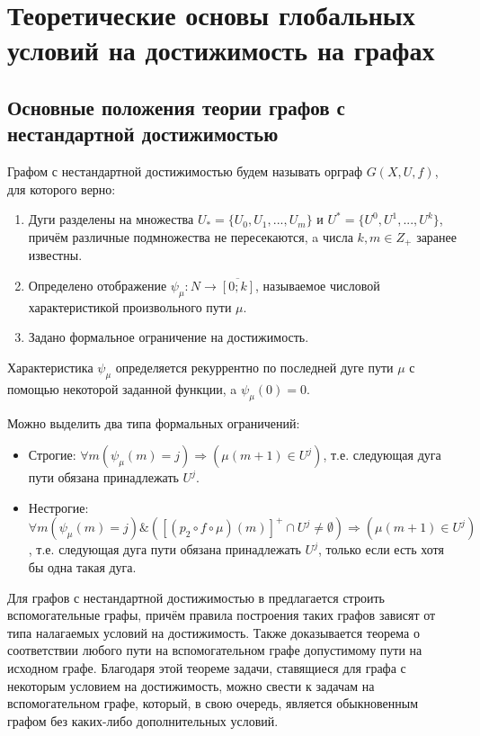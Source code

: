 \chapter{Теоретические основы глобальных условий на достижимость на графах}

\section{Основные положения теории графов с нестандартной достижимостью}

\begin{definition}
	Графом с нестандартной достижимостью будем называть орграф $G(X,U,f)$, для которого верно:
	\begin{enumerate}
		\item Дуги разделены на множества $U_* = \{U_0, U_1, ... , U_m\}$ и $U^* = \{U^0, U^1, ... , U^k\}$, причём различные подмножества не пересекаются, a числа $k, m \in Z_+$ заранее известны.
		\item Определено отображение $\psi_\mu:N\to \overline{ [0; k] }$, называемое числовой характеристикой произвольного пути $\mu$.
		\item Задано формальное ограничение на достижимость.
	\end{enumerate}
\end{definition}

Характеристика $\psi_\mu$ определяется рекуррентно по последней дуге пути $\mu$ с помощью некоторой заданной функции, a $\psi_\mu(0) = 0$.

Можно выделить два типа формальных ограничений:
\begin{itemize}
	\item Строгие: $\forall m (\psi_\mu(m) = j) \Longrightarrow (\mu(m+1) \in U^j) $, т.е. следующая дуга пути обязана принадлежать $U^j$.
	\item Нестрогие: $\forall m (\psi_\mu(m) = j) \& ([(p_2 \circ f \circ \mu)(m)]^+ \cap U^j \neq \emptyset) \Longrightarrow (\mu(m+1) \in U^j) $, т.е. следующая дуга пути обязана принадлежать $U^j$, только если есть хотя бы одна такая дуга.
\end{itemize}

Для графов с нестандартной достижимостью в \cite{Mono} предлагается строить вспомогательные графы, причём правила построения таких графов зависят от типа налагаемых условий на достижимость. Также доказывается теорема о соответствии любого пути на вспомогательном графе допустимому пути на исходном графе. Благодаря этой теореме задачи, ставящиеся для графа с некоторым условием на достижимость, можно свести к задачам на вспомогательном графе, который, в свою очередь, является обыкновенным графом без каких-либо дополнительных условий. 

